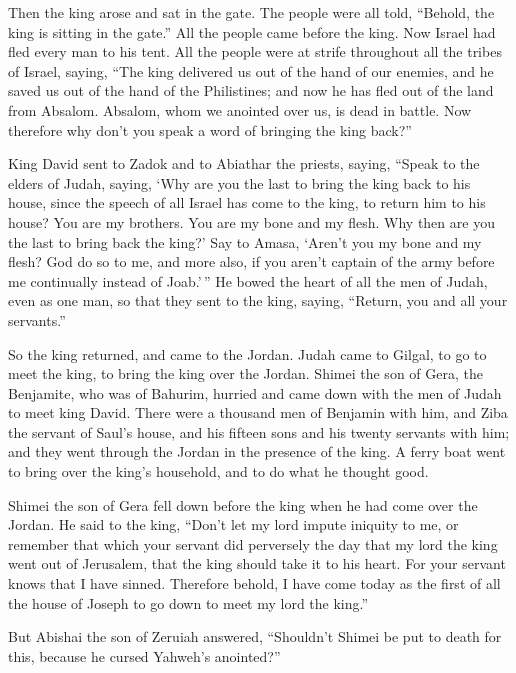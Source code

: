  Then the king arose and sat in the gate. The people were
all told, ``Behold, the king is sitting in the gate.'' All the people
came before the king. Now Israel had fled every man to his tent.
 All the people were at strife throughout all the tribes of
Israel, saying, ``The king delivered us out of the hand of our enemies,
and he saved us out of the hand of the Philistines; and now he has fled
out of the land from Absalom.  Absalom, whom we anointed
over us, is dead in battle. Now therefore why don't you speak a word of
bringing the king back?''

 King David sent to Zadok and to Abiathar the priests,
saying, ``Speak to the elders of Judah, saying, `Why are you the last to
bring the king back to his house, since the speech of all Israel has
come to the king, to return him to his house?  You are my
brothers. You are my bone and my flesh. Why then are you the last to
bring back the king?'  Say to Amasa, `Aren't you my bone
and my flesh? God do so to me, and more also, if you aren't captain of
the army before me continually instead of Joab.'\,''  He
bowed the heart of all the men of Judah, even as one man, so that they
sent to the king, saying, ``Return, you and all your servants.''

 So the king returned, and came to the Jordan. Judah came
to Gilgal, to go to meet the king, to bring the king over the Jordan.
 Shimei the son of Gera, the Benjamite, who was of Bahurim,
hurried and came down with the men of Judah to meet king David.
 There were a thousand men of Benjamin with him, and Ziba
the servant of Saul's house, and his fifteen sons and his twenty
servants with him; and they went through the Jordan in the presence of
the king.  A ferry boat went to bring over the king's
household, and to do what he thought good.

Shimei the son of Gera fell down before the king when he had come over
the Jordan.  He said to the king, ``Don't let my lord
impute iniquity to me, or remember that which your servant did
perversely the day that my lord the king went out of Jerusalem, that the
king should take it to his heart.  For your servant knows
that I have sinned. Therefore behold, I have come today as the first of
all the house of Joseph to go down to meet my lord the king.''

 But Abishai the son of Zeruiah answered, ``Shouldn't
Shimei be put to death for this, because he cursed Yahweh's anointed?''

